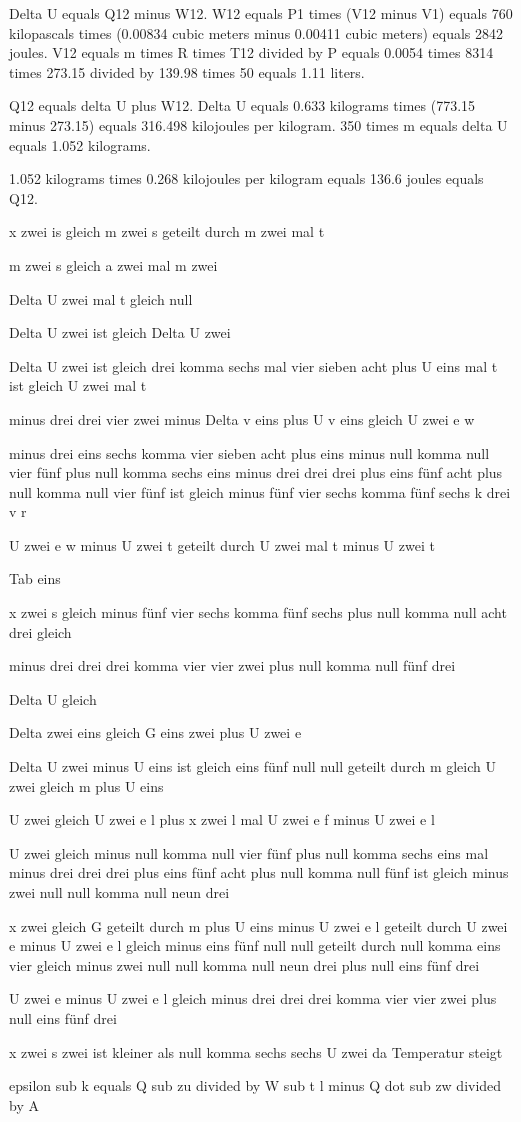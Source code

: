 Delta U equals Q12 minus W12.  
W12 equals P1 times (V12 minus V1) equals 760 kilopascals times (0.00834 cubic meters minus 0.00411 cubic meters) equals 2842 joules.  
V12 equals m times R times T12 divided by P equals 0.0054 times 8314 times 273.15 divided by 139.98 times 50 equals 1.11 liters.  

Q12 equals delta U plus W12.  
Delta U equals 0.633 kilograms times (773.15 minus 273.15) equals 316.498 kilojoules per kilogram.  
350 times m equals delta U equals 1.052 kilograms.  

1.052 kilograms times 0.268 kilojoules per kilogram equals 136.6 joules equals Q12.

x zwei is gleich m zwei s geteilt durch m zwei mal t

m zwei s gleich a zwei mal m zwei

Delta U zwei mal t gleich null

Delta U zwei ist gleich Delta U zwei

Delta U zwei ist gleich drei komma sechs mal vier sieben acht plus U eins mal t ist gleich U zwei mal t

minus drei drei vier zwei minus Delta v eins plus U v eins gleich U zwei e w

minus drei eins sechs komma vier sieben acht plus eins minus null komma null vier fünf plus null komma sechs eins minus drei drei drei plus eins fünf acht plus null komma null vier fünf ist gleich minus fünf vier sechs komma fünf sechs k drei v r

U zwei e w minus U zwei t geteilt durch U zwei mal t minus U zwei t

Tab eins

x zwei s gleich minus fünf vier sechs komma fünf sechs plus null komma null acht drei gleich

minus drei drei drei komma vier vier zwei plus null komma null fünf drei

Delta U gleich

Delta zwei eins gleich G eins zwei plus U zwei e

Delta U zwei minus U eins ist gleich eins fünf null null geteilt durch m gleich U zwei gleich m plus U eins

U zwei gleich U zwei e l plus x zwei l mal U zwei e f minus U zwei e l

U zwei gleich minus null komma null vier fünf plus null komma sechs eins mal minus drei drei drei plus eins fünf acht plus null komma null fünf ist gleich minus zwei null null komma null neun drei

x zwei gleich G geteilt durch m plus U eins minus U zwei e l geteilt durch U zwei e minus U zwei e l gleich minus eins fünf null null geteilt durch null komma eins vier gleich minus zwei null null komma null neun drei plus null eins fünf drei

U zwei e minus U zwei e l gleich minus drei drei drei komma vier vier zwei plus null eins fünf drei

x zwei s zwei ist kleiner als null komma sechs sechs U zwei da Temperatur steigt

epsilon sub k equals Q sub zu divided by W sub t l minus Q dot sub zw divided by A